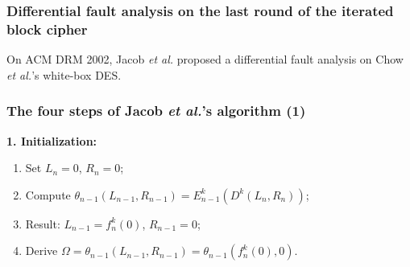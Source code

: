 \documentclass{beamer}
\begin{document}
\frame
{
\frametitle{Differential fault analysis on the last round of the iterated block cipher}
On ACM DRM 2002, Jacob \textit{et al.} proposed a differential fault analysis on Chow \textit{et al.}'s white-box DES.
\begin{center}

\end{center}
}

\frame
{
\frametitle{The four steps of Jacob \textit{et al.}'s algorithm (1)}
\textbf{1. Initialization:}
\begin{enumerate}[1)]
\item Set $L_{n}=0$, $R_{n}=0$;
\item Compute $\theta_{n-1}(L_{n-1}, R_{n-1})=E^{k}_{n-1}(D^{k}(L_{n}, R_{n}))$;
\item Result: $L_{n-1}=f^{k}_{n}(0)$, $R_{n-1}=0$;
\item Derive $\Omega=\theta_{n-1}(L_{n-1}, R_{n-1})=\theta_{n-1}(f^{k}_{n}(0),0)$.
\end{enumerate}
}
\end{document}
